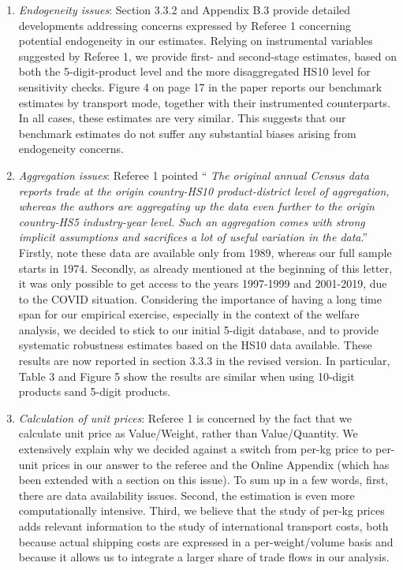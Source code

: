 \documentclass[12pt]{article}
\begin{document}
\begin{enumerate}


\item \emph{Endogeneity issues}: Section 3.3.2 and Appendix B.3 provide detailed developments addressing concerns expressed by Referee 1 concerning potential endogeneity in our estimates. Relying on instrumental variables suggested by Referee 1, we provide first- and second-stage estimates, based on both the 5-digit-product level and the more disaggregated HS10 level for sensitivity checks. Figure 4 on page 17 in the paper reports our benchmark estimates by transport mode, together with their instrumented counterparts. In all cases, these estimates are very similar. This suggests that our benchmark estimates do not suffer any substantial biases arising from endogeneity concerns.

\item \emph{Aggregation issues}: Referee 1 pointed `` \emph{The original annual Census data reports trade at the origin country-HS10 product-district level of aggregation, whereas the authors are aggregating up the data even further to the origin country-HS5 industry-year level. Such an aggregation comes with strong implicit assumptions and sacrifices a lot of useful variation in the data}.'' Firstly, note these data are available only from 1989, whereas our full sample starts in 1974. Secondly, as already mentioned at the beginning of this letter, it was only possible to get access to the years 1997-1999 and 2001-2019, due to the COVID situation. Considering the importance of having a long time span for our empirical exercise, especially in the context of the welfare analysis, we decided to stick to our initial 5-digit database, and to provide systematic robustness estimates based on the HS10 data available. These results are now reported in section 3.3.3 in the revised version. In particular, Table 3 and Figure 5 show the results are similar when using 10-digit products sand 5-digit products.

\item \emph{Calculation of unit prices}: Referee 1 is concerned by the fact that we calculate unit price as Value/Weight, rather than Value/Quantity. We extensively explain why we decided against a switch from per-kg price to per-unit prices in our answer to the referee and the Online Appendix (which has been extended with a section on this issue). To sum up in a few words, first, there are data availability issues. Second, the estimation is even more computationally intensive. Third, we believe that the study of per-kg prices adds relevant information to the study of international transport costs, both because actual shipping costs are expressed in a per-weight/volume basis and because it allows us to integrate a larger share of trade flows in our analysis.

\end{enumerate}
\end{document}
